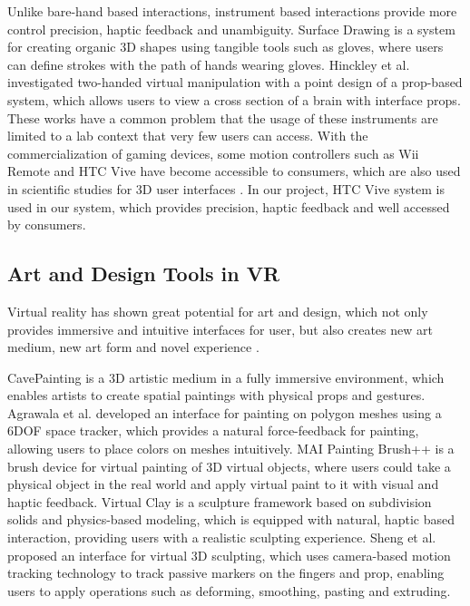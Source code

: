 \documentclass{svjour3}                     %
\begin{document}
Unlike bare-hand based interactions, instrument based interactions provide more control precision, haptic feedback and unambiguity.
Surface Drawing \cite{schkolne2001surface} is a system for creating organic 3D shapes using tangible tools such as gloves, where users can define strokes with the path of hands wearing gloves.
Hinckley et al. \cite{hinckley1998two} investigated two-handed virtual manipulation with a point design of a prop-based system, which allows users to view a cross section of a brain with interface props.
These works have a common problem that the usage of these instruments are limited to a lab context that very few users can access.
%
With the commercialization of gaming devices, some motion controllers such as Wii Remote and HTC Vive have become accessible to consumers, which are also used in scientific studies for 3D user interfaces \cite{wingcrave2010wii,niehorster2017accuracy}.
%
In our project, HTC Vive system is used in our system, which provides precision, haptic feedback and well accessed by consumers.

\subsection{Art and Design Tools in VR}
\label{sec:2.2}
Virtual reality has shown great potential for art and design, which not only provides immersive and intuitive interfaces for user, but also creates new art medium, new art form and novel experience \cite{laviola20113d}.

CavePainting \cite{keefe2001cavepainting} is a 3D artistic medium in a fully immersive environment, which enables artists to create spatial paintings with physical props and gestures. Agrawala et al. \cite{agrawala19953d} developed an interface for painting on polygon meshes using a 6DOF space tracker, which provides a natural force-feedback for painting, allowing users to place colors on meshes intuitively. MAI Painting Brush++ \cite{otsuki2017brush} is a brush device for virtual painting of 3D virtual objects, where users could take a physical object in the real world and apply virtual paint to it with visual and haptic feedback.
Virtual Clay \cite{mcdonnell2001virtual} is a sculpture framework based on subdivision solids and physics-based modeling, which is equipped with natural, haptic based interaction, providing users with a realistic sculpting experience. Sheng et al. \cite{sheng2006interface} proposed an interface for virtual 3D sculpting, which uses camera-based motion tracking technology to track passive markers on the fingers and prop, enabling users to apply operations such as deforming, smoothing, pasting and extruding.
\end{document}
